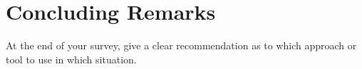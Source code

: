 \chapter{Concluding Remarks}

\label{chap:Concl}



At the end of your survey, give a clear recommendation
as to which approach or tool to use in which situation.


